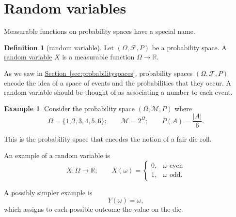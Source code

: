 \documentclass[a4paper]{scrartcl}
\newcommand{\R}{\mathbb{R}}
\newcommand{\defn}[1]{\ul{#1}}
\newcommand{\abs}[1]{\left|#1\right|}
\theoremstyle{definition}
\newtheorem{definition}{Definition}[section]
\newtheorem{example}{Example}[section]
\theoremstyle{plain}
\theoremstyle{remark}
\begin{document}
\section{Random variables}
Measurable functions on probability spaces have a special name.

\begin{definition}[random variable]
  \label{def:randomvariable}
  Let $(\Omega, \mathcal{F}, P)$ be a probability space. A \defn{random variable} $X$ is a measurable function $\Omega \to \R$.
\end{definition}

As we saw in \hyperref[sec:probabilityspaces]{Section~\ref*{sec:probabilityspaces}}, probability spaces $(\Omega, \mathcal{F}, P)$ encode the idea of a space of events and the probabilities that they occur. A random variable should be thought of as associating a number to each event.

\begin{example}
  Consider the probability space $(\Omega, \mathcal{M}, P)$ where
  \begin{equation*}
    \Omega = \{ 1, 2, 3, 4, 5, 6 \};\qquad \mathcal{M} = 2^{\Omega};\qquad P(A) = \frac{\abs{A}}{6}.
  \end{equation*}

  This is the probability space that encodes the notion of a fair die roll.

  An example of a random variable is
  \begin{equation*}
    X\colon \Omega \to \R;\qquad X(\omega) =
    \begin{cases}
      0, &\omega\text{ even} \\
      1, &\omega\text{ odd}.
    \end{cases}
  \end{equation*}

  A possibly simpler example is
  \begin{equation*}
    Y(\omega) = \omega,
  \end{equation*}
  which assigns to each possible outcome the value on the die.
\end{example}
\end{document}
